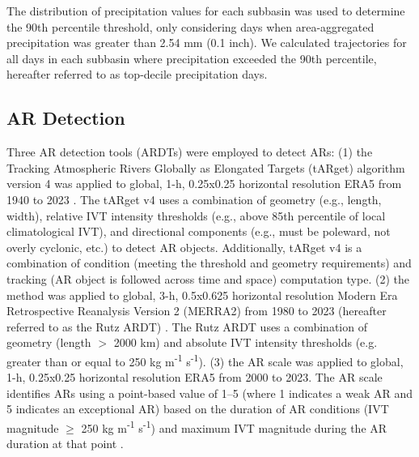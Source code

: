 \documentclass[draft]{agujournal2019}
\begin{document}

The distribution of precipitation values for each subbasin was used to determine the 90th percentile threshold, only considering days when area-aggregated precipitation was greater than 2.54 mm (0.1 inch). We calculated trajectories for all days in each subbasin where precipitation exceeded the 90th percentile, hereafter referred to as top-decile precipitation days.


\subsection{AR Detection}

Three AR detection tools (ARDTs) were employed to detect ARs: (1) the Tracking Atmospheric Rivers Globally as Elongated Targets (tARget) algorithm version 4 was applied to global, 1-h, 0.25\textdegree{}x0.25\textdegree{} horizontal resolution ERA5 from 1940 to 2023 \cite{Guan2024AERA5}. The tARget v4 uses a combination of geometry (e.g., length, width), relative IVT intensity thresholds (e.g., above 85th percentile of local climatological IVT), and directional components (e.g., must be poleward, not overly cyclonic, etc.) to detect AR objects. Additionally, tARget v4 is a combination of condition (meeting the threshold and geometry requirements) and tracking (AR object is followed across time and space) computation type. (2) the  method was applied to global, 3-h, 0.5\textdegree{}x0.625\textdegree{} horizontal resolution Modern Era Retrospective Reanalysis Version 2 (MERRA2) from 1980 to 2023 (hereafter referred to as the Rutz ARDT) \cite{Bosilovich2015, Gelaro2017}. The Rutz ARDT uses a combination of geometry (length $>$ 2000 km) and absolute IVT intensity thresholds (e.g. greater than or equal to 250 kg m\textsuperscript{-1} s\textsuperscript{-1}). (3) the AR scale \cite{MartinRalph2019} was applied to global, 1-h, 0.25\textdegree{}x0.25\textdegree{} horizontal resolution ERA5 from 2000 to 2023. The AR scale identifies ARs using a point-based value of 1--5 (where 1 indicates a weak AR and 5 indicates an exceptional AR) based on the duration of AR conditions (IVT magnitude $\geq$ 250 kg m\textsuperscript{-1} s\textsuperscript{-1}) and maximum IVT magnitude during the AR duration at that point \cite{MartinRalph2019}.

\end{document}
